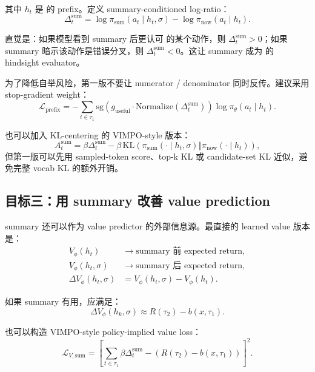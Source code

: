 \documentclass[10pt]{ctexart}
\begin{document}
其中 $h_t$ 是  的 prefix。定义 summary-conditioned log-ratio：
\begin{equation}
  \Delta_t^{\mathrm{sum}}
  = \log\pi_{\mathrm{sum}}(a_t\mid h_t,\sigma)
    - \log\pi_{\mathrm{now}}(a_t\mid h_t).
\end{equation}

直觉是：如果模型看到 summary 后更认可  的某个动作，则 $\Delta_t^{\mathrm{sum}}>0$；如果 summary 暗示该动作是错误分叉，则 $\Delta_t^{\mathrm{sum}}<0$。这让 summary 成为  的 hindsight evaluator。

为了降低自举风险，第一版不要让 numerator / denominator 同时反传。建议采用 stop-gradient weight：
\begin{equation}
  \mathcal{L}_{\mathrm{prefix}}
  = -\sum_{t\in\tau_1}
    \mathrm{sg}\left(g_{\mathrm{useful}}\cdot
    \mathrm{Normalize}(\Delta_t^{\mathrm{sum}})\right)
    \log \pi_\theta(a_t\mid h_t).
\end{equation}

也可以加入 KL-centering 的 VIMPO-style 版本：
\begin{equation}
  A_t^{\mathrm{sum}}
  = \beta\Delta_t^{\mathrm{sum}}
  - \beta\,\mathrm{KL}\!\left(\pi_{\mathrm{sum}}(\cdot\mid h_t,\sigma)
    \Vert \pi_{\mathrm{now}}(\cdot\mid h_t)\right),
\end{equation}
但第一版可以先用 sampled-token score、top-k KL 或 candidate-set KL 近似，避免完整 vocab KL 的额外开销。

\subsection{目标三：用 summary 改善 value prediction}
summary 还可以作为 value predictor 的外部信息源。最直接的 learned value 版本是：
\begin{align}
  V_\phi(h_t) &\rightarrow \text{summary 前 expected return},\\
  V_\phi(h_t,\sigma) &\rightarrow \text{summary 后 expected return},\\
  \Delta V_\phi(h_t,\sigma) &= V_\phi(h_t,\sigma)-V_\phi(h_t).
\end{align}

如果 summary 有用，应满足：
\begin{equation}
  \Delta V_\phi(h_k,\sigma)
  \approx R(\tau_2)-b(x,\tau_1).
\end{equation}

也可以构造 VIMPO-style policy-implied value loss：
\begin{equation}
  \mathcal{L}_{V,\mathrm{sum}}
  = \left[
    \sum_{t\in\tau_1}\beta\Delta_t^{\mathrm{sum}}
    - \left(R(\tau_2)-b(x,\tau_1)\right)
  \right]^2.
\end{equation}
\end{document}
